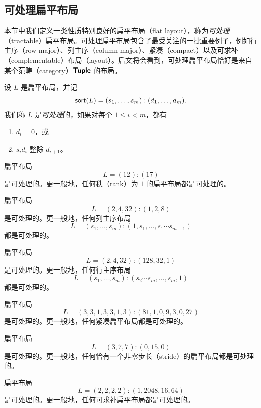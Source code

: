 \subsection{可处理扁平布局}

本节中我们定义一类性质特别良好的扁平布局（flat layout），称为{\it 可处理}（tractable）扁平布局。可处理扁平布局包含了最受关注的一批重要例子，例如行主序（row-major）、列主序（column-major）、紧凑（compact）以及可求补（complementable）布局（layout）。后文将会看到，可处理扁平布局恰好是来自某个范畴（category）${\boldsymbol{\mathsf{Tuple}}}$ 的布局。

\begin{definition}\label{definitionoftractableflatlayouts}
    设 $L$ 是扁平布局，并记
    \[
    \mathsf{sort}(L) = (s_1,\dots,s_m):(d_1,\dots,d_m).
    \]
    我们称 $L$ 是{\it 可处理}的，如果对每个 $1 \leq i < m$，都有
    \begin{enumerate}
        \item $d_i = 0$，或
        \item $s_id_i$ 整除 $d_{i+1}$。
    \end{enumerate}
\end{definition}


\begin{example}
    扁平布局
    \[L = (12):(17)\]
    是可处理的。更一般地，任何秩（rank）为 $1$ 的扁平布局都是可处理的。
\end{example}

\begin{example}
    扁平布局
    \[L = (2,4,32):(1,2,8)\]
    是可处理的。更一般地，任何列主序布局
    \[
    L = (s_1,\dots,s_m):(1,s_1,\dots,s_1 \cdots s_{m-1})
    \]
    都是可处理的。
\end{example}
\begin{example}
    扁平布局
    \[L = (2,4,32):(128,32,1)\]
    是可处理的。更一般地，任何行主序布局
    \[
    L = (s_1,\dots,s_m) : (s_2\cdots s_m, \dots, s_m , 1)
    \]
    都是可处理的。
\end{example}
\begin{example}
    扁平布局
    \[L = (3,3,1,3,3,1,3):(81,1,0,9,3,0,27)\]
    是可处理的。更一般地，任何紧凑扁平布局都是可处理的。
\end{example}

\begin{example}
    扁平布局
    \[L = (3,7,7):(0,15,0)\]
    是可处理的。更一般地，任何恰有一个非零步长（stride）的扁平布局都是可处理的。
\end{example}

\begin{example}
    扁平布局
    \[L = (2,2,2,2):(1,2048,16,64)\]
    是可处理的。更一般地，任何可求补扁平布局都是可处理的。
\end{example}

